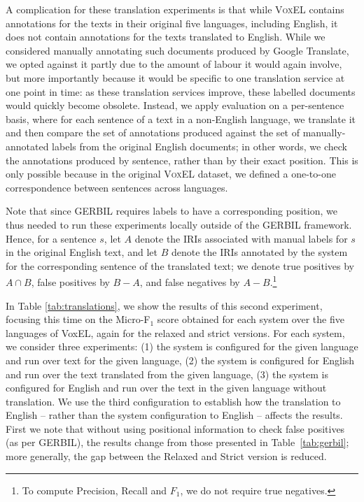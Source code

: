 \documentclass{llncs}
\begin{document}
A complication for these translation experiments is that while \textsc{VoxEL} contains annotations for the texts in their original five languages, including English, it does not contain annotations for the texts translated to English. While we considered manually annotating such documents produced by Google Translate, we opted against it partly due to the amount of labour it would again involve, but more importantly because it would be specific to one translation service at one point in time: as these translation services improve, these labelled documents would quickly become obsolete. Instead, we apply evaluation on a per-sentence basis, where for each sentence of a text in a non-English language, we translate it and then compare the set of annotations produced against the set of manually-annotated labels from the original English documents; in other words, we check the annotations produced by sentence, rather than by their exact position. This is only possible because in the original \textsc{VoxEL} dataset, we defined a one-to-one correspondence between sentences across languages. 

Note that since GERBIL requires labels to have a corresponding position, we thus needed to run these experiments locally outside of the GERBIL framework. Hence, for a sentence $s$, let $A$ denote the IRIs associated with manual labels for $s$ in the original English text, and let $B$ denote the IRIs annotated by the system for the corresponding sentence of the translated text; we denote true positives by $A \cap B$, false positives by $B - A$, and false negatives by $A - B$.\footnote{To compute Precision, Recall and $F_1$, we do not require true negatives.}

\newcommand{\blank}{\underline{\hspace{0.5em}}}

In Table \ref{tab:translations}, we show the results of this second experiment, focusing this time on the Micro-F$_1$ score obtained for each system over the five languages of VoxEL, again for the relaxed and strict versions. For each system, we consider three experiments: (1) the system is configured for the given language and run over text for the given language, (2) the system is configured for English and run over the text translated from the given language, (3) the system is configured for English and run over the text in the given language without translation. We use the third configuration to establish how the translation to English -- rather than the system configuration to English -- affects the results. First we note that without using positional information to check false positives (as per GERBIL), the results change from those presented in Table~\ref{tab:gerbil}; more generally, the gap between the Relaxed and Strict version is reduced. 
\end{document}
